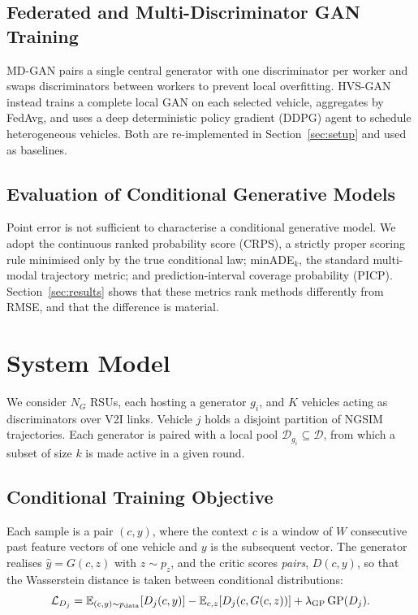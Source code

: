 \documentclass[journal]{IEEEtran}
\begin{document}
\subsection{Federated and Multi-Discriminator GAN Training}
MD-GAN \cite{hardy2019mdgan} pairs a single central generator with one
discriminator per worker and swaps discriminators between workers to prevent
local overfitting. HVS-GAN \cite{wu2024hvsgan} instead trains a complete local
GAN on each selected vehicle, aggregates by FedAvg, and uses a deep
deterministic policy gradient (DDPG) agent to schedule heterogeneous vehicles.
Both are re-implemented in Section~\ref{sec:setup} and used as baselines.

\subsection{Evaluation of Conditional Generative Models}
Point error is not sufficient to characterise a conditional generative model.
We adopt the continuous ranked probability score (CRPS), a strictly proper
scoring rule minimised only by the true conditional law; minADE$_k$, the
standard multi-modal trajectory metric; and prediction-interval coverage
probability (PICP). Section~\ref{sec:results} shows that these metrics rank
methods differently from RMSE, and that the difference is material.

\section{System Model}

We consider $N_G$ RSUs, each hosting a generator $g_i$, and $K$ vehicles acting
as discriminators over V2I links. Vehicle $j$ holds a disjoint partition of
NGSIM trajectories. Each generator is paired with a local pool
$\mathcal{D}_{g_i}\subseteq\mathcal{D}$, from which a subset of size $k$ is made
active in a given round.

\subsection{Conditional Training Objective}
Each sample is a pair $(c,y)$, where the context $c$ is a window of $W$
consecutive past feature vectors of one vehicle and $y$ is the subsequent
vector. The generator realises $\hat{y}=G(c,z)$ with $z\sim p_z$, and the critic
scores \emph{pairs}, $D(c,y)$, so that the Wasserstein distance is taken between
conditional distributions:
\begin{equation}
\mathcal{L}_{D_j} = \mathbb{E}_{(c,y)\sim p_{\rm data}}[D_j(c,y)]
  - \mathbb{E}_{c,z}[D_j(c,G(c,z))]
  + \lambda_{\rm GP}\,\mathrm{GP}(D_j).
\label{eq:critic}
\end{equation}
\end{document}
